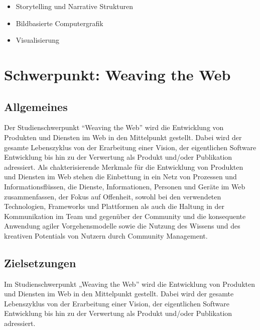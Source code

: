 \begin{itemize}
\tightlist
\item
  Storytelling und Narrative Strukturen
\item
  Bildbasierte Computergrafik
\item
  Visualisierung
\end{itemize}

\chapter{Schwerpunkt: Weaving the
Web\label{/mi-2017/modulbeschreibungen-master/schwerpunkt-weaving-the-web}}\label{schwerpunkt-weaving-the-webpathlabelmi-2017modulbeschreibungen-masterschwerpunkt-weaving-the-web}

\section*{Allgemeines\label{/mi-2017/modulbeschreibungen-master/schwerpunkt-weaving-the-web}}\label{allgemeinespathlabelmi-2017modulbeschreibungen-masterschwerpunkt-weaving-the-web}

Der Studienschwerpunkt ``Weaving the Web'' wird die Entwicklung von
Produkten und Diensten im Web in den Mittelpunkt gestellt. Dabei wird
der gesamte Lebenszyklus von der Erarbeitung einer Vision, der
eigentlichen Software Entwicklung bis hin zu der Verwertung als Produkt
und/oder Publikation adressiert. Als chakterisierende Merkmale für die
Entwicklung von Produkten und Diensten im Web stehen die Einbettung in
ein Netz von Prozessen und Informationsflüssen, die Dienste,
Informationen, Personen und Geräte im Web zusammenfassen, der Fokus auf
Offenheit, sowohl bei den verwendeten Technologien, Frameworks und
Plattformen als auch die Haltung in der Kommunikation im Team und
gegenüber der Community und die konsequente Anwendung agiler
Vorgehensmodelle sowie die Nutzung des Wissens und des kreativen
Potentials von Nutzern durch Community Management.

\section*{Zielsetzungen\label{/mi-2017/modulbeschreibungen-master/schwerpunkt-weaving-the-web}}\label{zielsetzungenpathlabelmi-2017modulbeschreibungen-masterschwerpunkt-weaving-the-web}

Im Studienschwerpunkt „Weaving the Web'' wird die Entwicklung von
Produkten und Diensten im Web in den Mittelpunkt gestellt. Dabei wird
der gesamte Lebenszyklus von der Erarbeitung einer Vision, der
eigentlichen Software Entwicklung bis hin zu der Verwertung als Produkt
und/oder Publikation adressiert.

